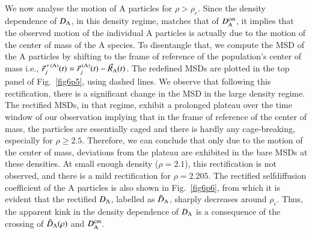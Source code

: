 We now analyse the motion of A particles for $\rho > \rho_c$. Since the density dependence of $D_{\rm A}$, in this density regime, matches that of $D_{\rm A}^{\rm cm}$, it implies that the observed motion of the individual A particles is actually due to the motion of the center of mass of the A species.  To disentangle that, we compute the MSD of the A particles by shifting to the frame of reference of the population's center of mass i.e., $\vec{r}^{\; \prime {\rm \; (A)}}_j(t) = \vec{r}_j^{\rm \; (A)}(t) - \vec{R}_{\rm A}(t)$. The redefined MSDs are plotted in the top panel of Fig.~\ref{fig6p5}, using dashed lines. We observe that following this rectification, there is a significant change in the MSD in the large density regime. The rectified MSDs, in that regime, exhibit a prolonged plateau over the time window of our observation implying that in the frame of reference of the center of mass, the particles are essentially caged and there is hardly any cage-breaking, especially for $\rho \geq 2.5$. Therefore, we can conclude that only due to the motion of the center of mass, deviations from the plateau are exhibited in the bare MSDs at these densities. At small enough density ($\rho=2.1$), this rectification is not observed, and there is a mild rectification for $\rho=2.205$.  The rectified selfdiffusion coefficient of the A particles is also shown in Fig.~\ref{fig6p6}, from which it is evident that the rectified $D_{\rm A}$, labelled as $\tilde{D}_{\rm A}$, sharply decreases around $\rho_c$. Thus, the apparent kink in the density dependence of $D_{\rm A}$ is a consequence of the crossing of $\tilde{D}_{\rm A}(\rho)$ and $D_{\rm A}^{\rm cm}$.


